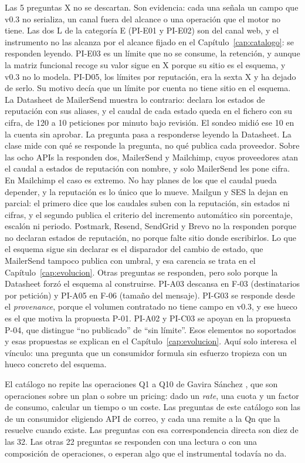 Las 5 preguntas X no se descartan. Son evidencia: cada una señala un campo que v0.3 no
serializa, un canal fuera del alcance o una operación que el motor no tiene. Las dos L
de la categoría E (PI-E01 y PI-E02) son del canal web, y el instrumento no las alcanza
por el alcance fijado en el Capítulo~\ref{cap:catalogo}: se responden leyendo. PI-E03 es
un límite que no se consume, la retención, y aunque la matriz funcional recoge su valor
sigue en X porque su sitio es el esquema, y v0.3 no lo modela.
PI-D05, los límites por reputación, era la sexta X y ha dejado de serlo. Su motivo decía
que un límite por cuenta no tiene sitio en el esquema. La Datasheet de MailerSend muestra
lo contrario: declara los estados de reputación con sus aliases, y el caudal de cada
estado queda en el fichero con su cifra, de 120 a 10 peticiones por minuto bajo revisión.
El sondeo midió ese 10 en la cuenta sin aprobar. La pregunta pasa a responderse leyendo
la Datasheet.
La clase mide con qué se responde la pregunta, no qué publica cada proveedor.
Sobre las ocho APIs la responden dos, MailerSend y Mailchimp, cuyos proveedores atan el caudal a estados de
reputación con nombre, y solo MailerSend les pone cifra.
En Mailchimp el caso es extremo. No hay planes de los que el caudal pueda depender,
y la reputación es lo único que lo mueve. Mailgun y SES la dejan en parcial:
el primero dice que los caudales suben con la reputación, sin estados ni cifras, y el
segundo publica el criterio del incremento automático sin porcentaje, escalón ni
periodo. Postmark, Resend, SendGrid y Brevo no la responden porque no declaran estados de reputación,
no porque falte sitio donde escribirlos. Lo que el esquema sigue sin declarar es el
disparador del cambio de estado, que MailerSend tampoco publica con umbral, y esa
carencia se trata en el Capítulo~\ref{cap:evolucion}.
Otras preguntas se responden, pero solo porque la Datasheet forzó el esquema al
construirse. PI-A03 descansa en F-03 (destinatarios por petición) y PI-A05 en F-06
(tamaño del mensaje). PI-G03 se responde desde el \textit{provenance}, porque el
volumen contratado no tiene campo en v0.3, y ese hueco es el que motiva la propuesta
P-01. PI-A02 y PI-C03 se apoyan en la propuesta P-04, que distingue ``no publicado''
de ``sin límite''. Esos elementos no soportados y esas propuestas se explican en el
Capítulo~\ref{cap:evolucion}. Aquí solo interesa el vínculo: una pregunta que un
consumidor formula sin esfuerzo tropieza con un hueco concreto del esquema.

El catálogo no repite las operaciones Q1 a Q10 de Gavira Sánchez
\citep{gavira2026tfm}, que son operaciones sobre un plan o sobre un pricing: dado un
\textit{rate}, una cuota y un factor de consumo, calcular un tiempo o un coste. Las
preguntas de este catálogo son las de un consumidor eligiendo API de correo, y cada una
remite a la Qn que la resuelve cuando existe. Las preguntas con esa correspondencia
directa son diez de las 32.
Las otras 22 preguntas se responden con una lectura o con una composición de operaciones, o esperan algo que el instrumental todavía no da.

